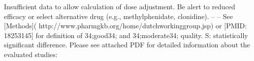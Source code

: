 \markdownRendererPipe{} Insufficient data to allow calculation of dose adjustment. Be alert to reduced efficacy or select alternative drug (e.g., methylphenidate, clonidine). \markdownRendererPipe{} -- \markdownRendererPipe{} -- \markdownRendererPipe{}\markdownRendererInterblockSeparator
{}\markdownRendererUlBeginTight
\markdownRendererUlItem *See [Methods]( http://www.pharmgkb.org/home/dutchworking\markdownRendererUnderscore{}group.jsp) or [PMID: 18253145] for definition of \markdownRendererAmpersand{}\markdownRendererHash{}34;good\markdownRendererAmpersand{}\markdownRendererHash{}34; and \markdownRendererAmpersand{}\markdownRendererHash{}34;moderate\markdownRendererAmpersand{}\markdownRendererHash{}34; quality.\markdownRendererUlItemEnd 
\markdownRendererUlItem S: statistically significant difference.\markdownRendererUlItemEnd 
\markdownRendererUlItem Please see attached PDF for detailed information about the evaluated studies: \markdownRendererUlItemEnd 
\markdownRendererUlEndTight \relax